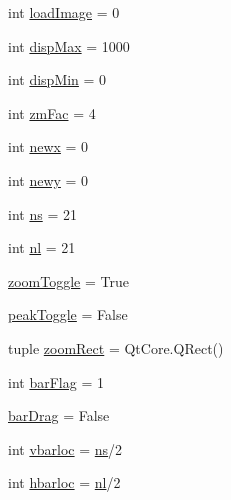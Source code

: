 \begin{DoxyCompactItemize}
\item 
int \hyperlink{classmy_zm_peak_display_1_1my_zm_peak_display_a52a6206bea396c772d3c3f3bd9e39263}{load\-Image} = 0
\item 
int \hyperlink{classmy_zm_peak_display_1_1my_zm_peak_display_a513bd49e45f862ce6d675c0fd1403d1a}{disp\-Max} = 1000
\item 
int \hyperlink{classmy_zm_peak_display_1_1my_zm_peak_display_aaee145150aa3dc3ec84d322d1361fc9d}{disp\-Min} = 0
\item 
int \hyperlink{classmy_zm_peak_display_1_1my_zm_peak_display_af5ac7ba7a7d3b83223b61462349f6d46}{zm\-Fac} = 4
\item 
int \hyperlink{classmy_zm_peak_display_1_1my_zm_peak_display_a61900777c8f1ee16eefca8614f7a940c}{newx} = 0
\item 
int \hyperlink{classmy_zm_peak_display_1_1my_zm_peak_display_ac6ef82ef45e92d1380a4122b085933e6}{newy} = 0
\item 
int \hyperlink{classmy_zm_peak_display_1_1my_zm_peak_display_a76602f7e8c11dbd816a9161b0a864ccd}{ns} = 21
\item 
int \hyperlink{classmy_zm_peak_display_1_1my_zm_peak_display_a98ac7ad822c6d740e6a748b1dabb96b5}{nl} = 21
\item 
\hyperlink{classmy_zm_peak_display_1_1my_zm_peak_display_ac2ffc7ced35826e8eed43f5abbf0e3d0}{zoom\-Toggle} = True
\item 
\hyperlink{classmy_zm_peak_display_1_1my_zm_peak_display_a4a28127e7e5fa8bab3d21c4693d7fede}{peak\-Toggle} = False
\item 
tuple \hyperlink{classmy_zm_peak_display_1_1my_zm_peak_display_a43b75e7b7d508ce23a9f4e663917fa01}{zoom\-Rect} = Qt\-Core.\-Q\-Rect()
\item 
int \hyperlink{classmy_zm_peak_display_1_1my_zm_peak_display_ac88fb195fd24548062bf22107b9dfa18}{bar\-Flag} = 1
\item 
\hyperlink{classmy_zm_peak_display_1_1my_zm_peak_display_a297952d3c6546ef718feb343566fe283}{bar\-Drag} = False
\item 
int \hyperlink{classmy_zm_peak_display_1_1my_zm_peak_display_ad44d50518d3ab0f2eb9c3ddb0d247906}{vbarloc} = \hyperlink{classmy_zm_peak_display_1_1my_zm_peak_display_a76602f7e8c11dbd816a9161b0a864ccd}{ns}/2
\item 
int \hyperlink{classmy_zm_peak_display_1_1my_zm_peak_display_a27608279f98a23a7c3c869df0d3995ce}{hbarloc} = \hyperlink{classmy_zm_peak_display_1_1my_zm_peak_display_a98ac7ad822c6d740e6a748b1dabb96b5}{nl}/2

\end{DoxyCompactItemize}
